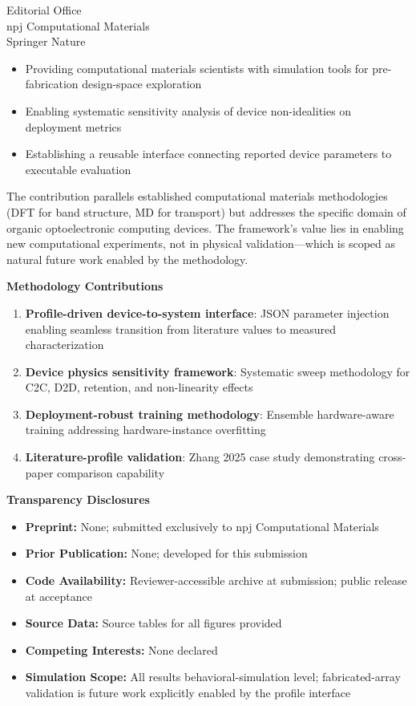 \documentclass[11pt,a4paper]{letter}
\begin{document}
\begin{letter}{Editorial Office\\npj Computational Materials\\Springer Nature}
\begin{itemize}
    \item Providing computational materials scientists with simulation tools for pre-fabrication design-space exploration
    \item Enabling systematic sensitivity analysis of device non-idealities on deployment metrics
    \item Establishing a reusable interface connecting reported device parameters to executable evaluation
\end{itemize}

The contribution parallels established computational materials methodologies (DFT for band structure, MD for transport) but addresses the specific domain of organic optoelectronic computing devices. The framework's value lies in enabling new computational experiments, not in physical validation---which is scoped as natural future work enabled by the methodology.

\vspace{0.5em}
\textbf{Methodology Contributions}

\begin{enumerate}
    \item \textbf{Profile-driven device-to-system interface}: JSON parameter injection enabling seamless transition from literature values to measured characterization
    \item \textbf{Device physics sensitivity framework}: Systematic sweep methodology for C2C, D2D, retention, and non-linearity effects
    \item \textbf{Deployment-robust training methodology}: Ensemble hardware-aware training addressing hardware-instance overfitting
    \item \textbf{Literature-profile validation}: Zhang 2025 case study demonstrating cross-paper comparison capability
\end{enumerate}

\vspace{0.5em}
\textbf{Transparency Disclosures}

\begin{itemize}
    \item \textbf{Preprint:} None; submitted exclusively to npj Computational Materials
    \item \textbf{Prior Publication:} None; developed for this submission
    \item \textbf{Code Availability:} Reviewer-accessible archive at submission; public release at acceptance
    \item \textbf{Source Data:} Source tables for all figures provided
    \item \textbf{Competing Interests:} None declared
    \item \textbf{Simulation Scope:} All results behavioral-simulation level; fabricated-array validation is future work explicitly enabled by the profile interface
\end{itemize}


\end{letter}
\end{document}
